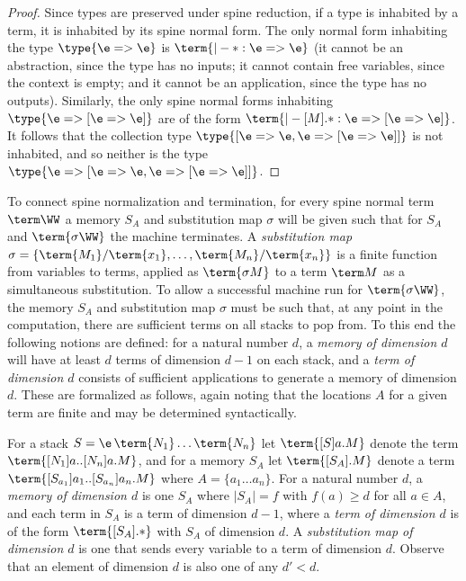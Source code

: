 \documentclass[10pt,a4paper]{amsart}
\begin{document}
\begin{proof}
Since types are preserved under spine reduction, if a type is inhabited by a term, it is inhabited by its spine normal form. The only normal form inhabiting the type $\type{\e=>\e}$ is $\term{|- * : \e=>\e}$ (it cannot be an abstraction, since the type has no inputs; it cannot contain free variables, since the context is empty; and it cannot be an application, since the type has no outputs). Similarly, the only spine normal forms inhabiting $\type{\e => [\e=>\e]}$ are of the form $\term{|- [M].* : \e => [\e =>\e ]}$. It follows that the collection type $\type{[ \e=>\e , \e => [\e=>\e] ]}$ is not inhabited, and so neither is the type $\type{\e => [ \e=>\e , \e => [\e=>\e] ]}$.
\end{proof}

To connect spine normalization and termination, for every spine normal term $\term\WW$ a memory $S_A$ and substitution map $\sigma$ will be given such that for $S_A$ and $\term{\sigma\WW}$ the machine terminates. A \emph{substitution map} $\sigma=\{\term{M_1}/\term{x_1},\dots,\term{M_n}/\term{x_n}\}$ is a finite function from variables to terms, applied as $\term{\sigma M}$ to a term $\term M$ as a simultaneous substitution. To allow a successful machine run for $\term{\sigma\WW}$, the memory $S_A$ and substitution map $\sigma$ must be such that, at any point in the computation, there are sufficient terms on all stacks to pop from. To this end the following notions are defined: for a natural number $d$, a \emph{memory of dimension $d$} will have at least $d$ terms of dimension $d-1$ on each stack, and a \emph{term of dimension $d$} consists of sufficient applications to generate a memory of dimension $d$. These are formalized as follows, again noting that the locations $A$ for a given term are finite and may be determined syntactically.

For a stack $S=\e\,\term{N_1}\dots\term{N_n}$ let $\term{[S]a.M}$ denote the term $\term{[N_1]a..[N_n]a.M}$, and for a memory $S_A$ let $\term{[S_A].M}$ denote a term $\term{[S_{a_1}]a_1..[S_{a_n}]a_n.M}$ where $A=\{a_1\dots a_n\}$. For a natural number $d$, a \emph{memory of dimension $d$} is one $S_A$ where $|S_A|=f$ with $f(a)\geq d$ for all $a\in A$, and each term in $S_A$ is a term of dimension $d-1$, where a \emph{term of dimension $d$} is of the form $\term{[S_A].*}$ with $S_A$ of dimension $d$. A \emph{substitution map of dimension $d$} is one that sends every variable to a term of dimension $d$. Observe that an element of dimension $d$ is also one of any $d'< d$.
\end{document}
